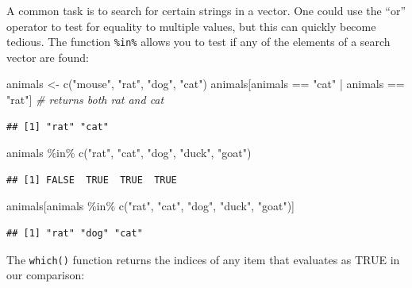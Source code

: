 \documentclass[
]{book}
\newenvironment{Shaded}{\begin{snugshade}}{\end{snugshade}}
\newcommand{\CommentTok}[1]{\textcolor[rgb]{0.56,0.35,0.01}{\textit{#1}}}
\newcommand{\FunctionTok}[1]{\textcolor[rgb]{0.00,0.00,0.00}{#1}}
\newcommand{\NormalTok}[1]{#1}
\newcommand{\OtherTok}[1]{\textcolor[rgb]{0.56,0.35,0.01}{#1}}
\newcommand{\SpecialCharTok}[1]{\textcolor[rgb]{0.00,0.00,0.00}{#1}}
\newcommand{\StringTok}[1]{\textcolor[rgb]{0.31,0.60,0.02}{#1}}
\begin{document}
A common task is to search for certain strings in a vector. One could use the ``or'' operator \textbar{} to test for equality to multiple values, but this can quickly become tedious. The function \texttt{\%in\%} allows you to test if any of the elements of a search vector are found:

\begin{Shaded}
\begin{Highlighting}[]
\NormalTok{animals }\OtherTok{\textless{}{-}} \FunctionTok{c}\NormalTok{(}\StringTok{"mouse"}\NormalTok{, }\StringTok{"rat"}\NormalTok{, }\StringTok{"dog"}\NormalTok{, }\StringTok{"cat"}\NormalTok{)}
\NormalTok{animals[animals }\SpecialCharTok{==} \StringTok{"cat"} \SpecialCharTok{|}\NormalTok{ animals }\SpecialCharTok{==} \StringTok{"rat"}\NormalTok{] }\CommentTok{\# returns both rat and cat}
\end{Highlighting}
\end{Shaded}

\begin{verbatim}
## [1] "rat" "cat"
\end{verbatim}

\begin{Shaded}
\begin{Highlighting}[]
\NormalTok{animals }\SpecialCharTok{\%in\%} \FunctionTok{c}\NormalTok{(}\StringTok{"rat"}\NormalTok{, }\StringTok{"cat"}\NormalTok{, }\StringTok{"dog"}\NormalTok{, }\StringTok{"duck"}\NormalTok{, }\StringTok{"goat"}\NormalTok{)}
\end{Highlighting}
\end{Shaded}

\begin{verbatim}
## [1] FALSE  TRUE  TRUE  TRUE
\end{verbatim}

\begin{Shaded}
\begin{Highlighting}[]
\NormalTok{animals[animals }\SpecialCharTok{\%in\%} \FunctionTok{c}\NormalTok{(}\StringTok{"rat"}\NormalTok{, }\StringTok{"cat"}\NormalTok{, }\StringTok{"dog"}\NormalTok{, }\StringTok{"duck"}\NormalTok{, }\StringTok{"goat"}\NormalTok{)]}
\end{Highlighting}
\end{Shaded}

\begin{verbatim}
## [1] "rat" "dog" "cat"
\end{verbatim}

The \texttt{which()} function returns the indices of any item that evaluates as TRUE in our comparison:
\end{document}
